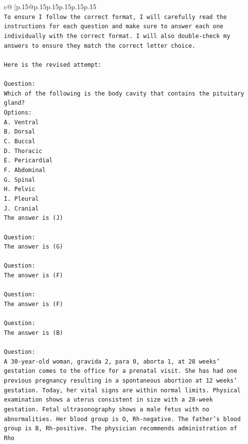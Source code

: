 \documentclass{article}
\begin{document}
{\begin{supertabular}{c@{$\;$}|p{.15\linewidth}@{}p{.15\linewidth}p{.15\linewidth}p{.15\linewidth}p{.15\linewidth}p{.15\linewidth}}
{{{\\ 
\texttt{To ensure I follow the correct format, I will carefully read the instructions for each question and make sure to answer each one individually with the correct format. I will also double{-}check my answers to ensure they match the correct letter choice.} \\
\\ 
\texttt{Here is the revised attempt:} \\
\\ 
\texttt{Question:} \\
\texttt{Which of the following is the body cavity that contains the pituitary gland?} \\
\texttt{Options:} \\
\texttt{A. Ventral} \\
\texttt{B. Dorsal} \\
\texttt{C. Buccal} \\
\texttt{D. Thoracic} \\
\texttt{E. Pericardial} \\
\texttt{F. Abdominal} \\
\texttt{G. Spinal} \\
\texttt{H. Pelvic} \\
\texttt{I. Pleural} \\
\texttt{J. Cranial} \\
\texttt{The answer is (J)} \\
\\ 
\texttt{Question:} \\
\texttt{The answer is (G)} \\
\\ 
\texttt{Question:} \\
\texttt{The answer is (F)} \\
\\ 
\texttt{Question:} \\
\texttt{The answer is (F)} \\
\\ 
\texttt{Question:} \\
\texttt{The answer is (B)} \\
\\ 
\texttt{Question:} \\
\texttt{A 30{-}year{-}old woman, gravida 2, para 0, aborta 1, at 28 weeks' gestation comes to the office for a prenatal visit. She has had one previous pregnancy resulting in a spontaneous abortion at 12 weeks' gestation. Today, her vital signs are within normal limits. Physical examination shows a uterus consistent in size with a 28{-}week gestation. Fetal ultrasonography shows a male fetus with no abnormalities. Her blood group is O, Rh{-}negative. The father's blood group is B, Rh{-}positive. The physician recommends administration of Rho} \\
}}}
\end{supertabular}}
\end{document}
